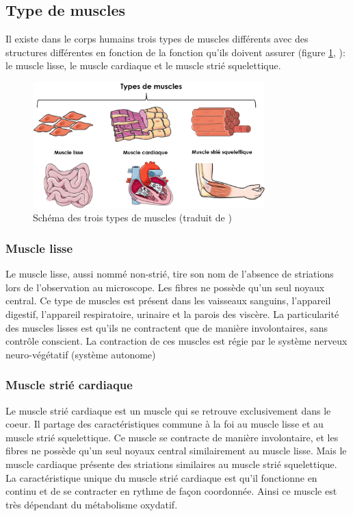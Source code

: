 \subsection{Type de muscles}
Il existe dans le corps humains trois types de muscles différents avec des structures différentes en fonction de la fonction qu'ils doivent assurer (figure \ref{fig:muscle-type}, \cite{gomez_oca_physiological_2021}): le muscle lisse, le muscle cardiaque et le muscle strié squelettique.
\begin{figure}[!ht]
 \centering
 \includegraphics[width=0.8\textwidth]{figures/muscle_type.png}
 \caption[Schéma des trois types de muscles]{Schéma des trois types de muscles (traduit de \cite{gomez_oca_physiological_2021})}
 \label{fig:muscle-type}
\end{figure}
\subsubsection{Muscle lisse}
Le muscle lisse, aussi nommé non-strié, tire son nom de l'absence de striations lors de l'observation au microscope. Les fibres ne possède qu'un seul noyaux central. Ce type de muscles est présent dans les vaisseaux sanguins, l'appareil digestif, l'appareil respiratoire, urinaire et la parois des viscère. La particularité des muscles lisses est qu'ils ne contractent que de manière involontaires, sans contrôle conscient. La contraction de ces muscles est régie par le système nerveux neuro-végétatif (système autonome)

\subsubsection{Muscle strié cardiaque}
Le muscle strié cardiaque est un muscle qui se retrouve exclusivement dans le coeur. Il partage des caractéristiques commune à la foi au muscle lisse et au muscle strié squelettique. Ce muscle se contracte de manière involontaire, et les fibres ne possède qu'un seul noyaux central similairement au muscle lisse. Mais le muscle cardiaque présente des striations similaires au muscle strié squelettique. La caractéristique unique du muscle strié cardiaque est qu'il fonctionne en continu et de se contracter en rythme de façon coordonnée. Ainsi ce muscle est très dépendant du métabolisme oxydatif.

